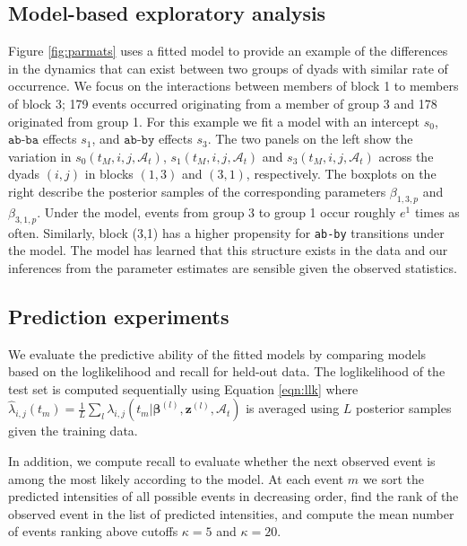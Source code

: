 \subsection{Model-based exploratory analysis}

Figure \ref{fig:parmats} uses a fitted model to provide an example of the differences in the dynamics that can exist between two groups of dyads with similar rate of occurrence.
We focus on the interactions between members of block 1 to members of block 3; 179 events occurred originating from a member of group 3 and 178 originated from group 1.
For this example we fit a model with an intercept $s_0$, $\texttt{ab-ba}$ effects $s_1$, and $\texttt{ab-by}$ effects $s_3$.
The two panels on the left show the variation in $s_0(t_M,i,j,\mathcal{A}_t)$, $s_1(t_M,i,j,\mathcal{A}_t)$ and $s_3(t_M,i,j,\mathcal{A}_t)$ across the dyads $(i,j)$ in blocks $(1,3)$ and $(3,1)$, respectively.
The boxplots on the right describe the posterior samples of the corresponding parameters $\beta_{1,3,p}$ and $\beta_{3,1,p}$.
Under the model, events from group 3 to group 1 occur roughly $e^1$ times as often.
Similarly, block (3,1) has a higher propensity for \texttt{ab-by} transitions under the model.
The model has learned that this structure exists in the data and our inferences from the parameter estimates are sensible given the observed statistics.

\subsection{Prediction experiments}

We evaluate the predictive ability of the fitted models by comparing models based on the loglikelihood and recall for held-out data.
The loglikelihood of the test set is computed sequentially using Equation \ref{eqn:llk} where $\hat{\lambda}_{i,j}(t_m) = \frac{1}{L}\sum_l \lambda_{i,j}(t_m | \boldsymbol{\beta}^{(l)}, \mathbf{z}^{(l)},\mathcal{A}_t)$ is averaged using $L$ posterior samples given the training data.

In addition, we compute recall to evaluate whether the next observed event is among the most likely according to the model.
At each event $m$ we sort the predicted intensities of all possible events in decreasing order, find the rank of the observed event in the list of predicted intensities, and compute the mean number of events ranking above cutoffs $\kappa=5$ and $\kappa=20$. 

